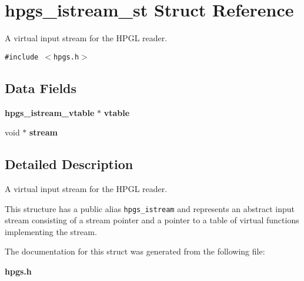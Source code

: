 \section{hpgs\_\-istream\_\-st Struct Reference}
\label{structhpgs__istream__st}
A virtual input stream for the HPGL reader.  


{\tt \#include $<$hpgs.h$>$}

\subsection*{Data Fields}
\begin{CompactItemize}
\item 
{\bf hpgs\_\-istream\_\-vtable} $\ast$ \textbf{vtable}\label{structhpgs__istream__st_a95c5bd08db87fc8107da506e04a6ae8}

\item 
void $\ast$ \textbf{stream}\label{structhpgs__istream__st_e39160d1208f499051fb6490de0a350b}

\end{CompactItemize}


\subsection{Detailed Description}
A virtual input stream for the HPGL reader. 

This structure has a public alias {\tt hpgs\_\-istream} and represents an abstract input stream consisting of a stream pointer and a pointer to a table of virtual functions implementing the stream. 

The documentation for this struct was generated from the following file:\begin{CompactItemize}
\item 
{\bf hpgs.h}\end{CompactItemize}
